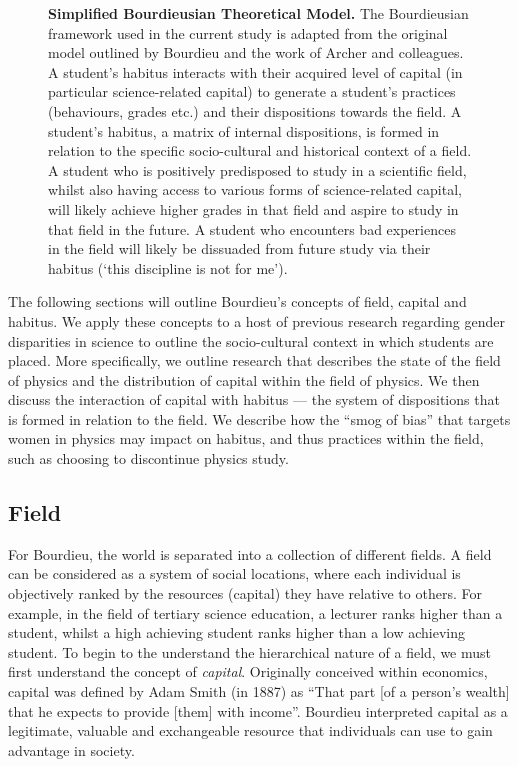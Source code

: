 \begin{figure}[!ht]
\begin{center}
\end{center}
\caption{\textbf{Simplified Bourdieusian Theoretical Model.\newline}
The Bourdieusian framework used in the current study is adapted from the original model outlined by Bourdieu\cite{Bourdieu1984} and the work of Archer and colleagues.\cite{Archer2012,Archer2014, Archer_2015} A student's habitus interacts with their acquired level of capital (in particular science-related capital) to generate a student's practices (behaviours, grades etc.) and their dispositions towards the field. A student's habitus, a matrix of internal dispositions\cite{Reay2004}, is formed in relation to the specific socio-cultural and historical context of a field. A student who is positively predisposed to study in a scientific field, whilst also having access to various forms of science-related capital, will likely achieve higher grades in that field and aspire to study in that field in the future. A student who encounters bad experiences in the field will likely be dissuaded from future study via their habitus (`this discipline is not for me').}
\label{Fig1} 
\end{figure}

The following sections will outline Bourdieu's concepts of field, capital and habitus. We apply these concepts to a host of previous research regarding gender disparities in science to outline the socio-cultural context in which students are placed. More specifically, we outline research that describes the state of the field of physics and the distribution of capital within the field of physics. We then discuss the interaction of capital with habitus --- the system of dispositions that is formed in relation to the field. We describe how the ``smog of bias''\cite{Kost_Smith_2010} that targets women in physics may impact on habitus, and thus practices within the field, such as choosing to discontinue physics study. 

\subsection*{Field}
For Bourdieu, the world is separated into a collection of different fields.\cite{Bourdieu1984} A field can be considered as a system of social locations, where each individual is objectively ranked by the resources (capital) they have relative to others. For example, in the field of tertiary science education, a lecturer ranks higher than a student, whilst a high achieving student ranks higher than a low achieving student. To begin to the understand the hierarchical nature of a field, we must first understand the concept of \textit{capital}. Originally conceived within economics, capital was defined by Adam Smith (in 1887) as ``That part [of a person's wealth] that he expects to provide [them] with \textellipsis income\textellipsis''.\cite{Smith_1887} Bourdieu interpreted capital as a legitimate, valuable and exchangeable resource that individuals can use to gain advantage in society.\cite{Bourdieu_1986}


